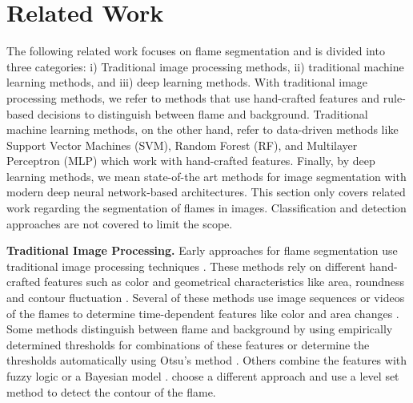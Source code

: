 \documentclass{isprs} %
\begin{document}
\section{Related Work}\label{Related Work}

The following related work focuses on flame segmentation and is divided into three categories: i) Traditional image processing methods, ii) traditional machine learning methods, and iii) deep learning methods. With traditional image processing methods, we refer to methods that use hand-crafted features and rule-based decisions to distinguish between flame and background. Traditional machine learning methods, on the other hand, refer to data-driven methods like Support Vector Machines (SVM), Random Forest (RF), and Multilayer Perceptron (MLP) which work with hand-crafted features. Finally, by deep learning methods, we mean state-of-the art methods for image segmentation with modern deep neural network-based architectures. This section only covers related work regarding the segmentation of flames in images. Classification and detection approaches are not covered to limit the scope.

\textbf{Traditional Image Processing.}
Early approaches for flame segmentation use traditional image processing techniques \citep{celik2007fire,zhang2009color,fan2014flame,wang2014flame,matthes2019new,li2020flame}. These methods rely on different hand-crafted features such as color \citep{celik2007fire,zhang2009color,wang2014flame,li2020flame} and geometrical characteristics like area, roundness and contour fluctuation \citep{zhang2009color}. Several of these methods use image sequences or videos of the flames to determine time-dependent features like color and area changes \citep{zhang2009color,wang2014flame,matthes2019new,li2020flame}. Some methods distinguish between flame and background by using empirically determined thresholds for combinations of these features \citep{zhang2009color,wang2014flame} or determine the thresholds automatically using Otsu's method \citep{matthes2019new}. Others combine the features with fuzzy logic \citep{celik2007fire} or a Bayesian model \citep{li2020flame}. \citet{fan2014flame} choose a different approach and use a level set method to detect the contour of the flame.
\end{document}
